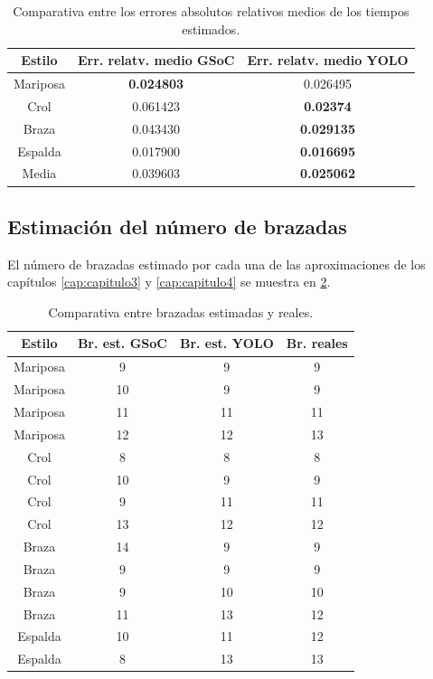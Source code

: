 \begin{table}[]
    \centering
    \small
    \begin{tabular}{|c|c|c|} \hline
         Estilo & Err. relatv. medio GSoC & Err. relatv. medio YOLO  \\ \hline
         Mariposa & \textbf{0.024803} & 0.026495 \\
         Crol & 0.061423 & \textbf{0.02374}  \\   
         Braza & 0.043430 & \textbf{0.029135} \\
         Espalda & 0.017900 & \textbf{0.016695} \\
         Media & 0.039603 & \textbf{0.025062} \\ \hline
    \end{tabular}
    \caption{Comparativa entre los errores absolutos relativos medios de los tiempos estimados.}
    \label{tab:tablatiemposmedioscap5}
\end{table} 

\subsection{Estimación del número de brazadas }
El número de brazadas estimado por cada una de las aproximaciones de los capítulos \ref{cap:capitulo3} y \ref{cap:capitulo4} se muestra en \ref{tab:tablabrazadascap5}.

\begin{table}[]
    \centering
    \small
    \begin{tabular}{|c|c|c|c|} \hline
         Estilo & Br. est. GSoC & Br. est. YOLO & Br. reales  \\ \hline
         Mariposa & 9 & 9 & 9  \\   
         Mariposa & 10 & 9 & 9 \\
         Mariposa & 11 & 11 & 11 \\
         Mariposa & 12 & 12 & 13 \\
         Crol & 8 & 8 & 8  \\
         Crol & 10 & 9 & 9 \\
         Crol & 9 & 11 & 11 \\  
         Crol & 13 & 12 & 12 \\
         Braza & 14 & 9 & 9 \\  
         Braza & 9 & 9 & 9 \\
         Braza & 9 & 10 & 10  \\
         Braza & 11 & 13 & 12  \\
         Espalda & 10 & 11 & 12 \\
         Espalda & 8 & 13 & 13 \\ \hline
    \end{tabular}
    \caption{Comparativa entre brazadas estimadas y reales.}
    \label{tab:tablabrazadascap5}
\end{table}



